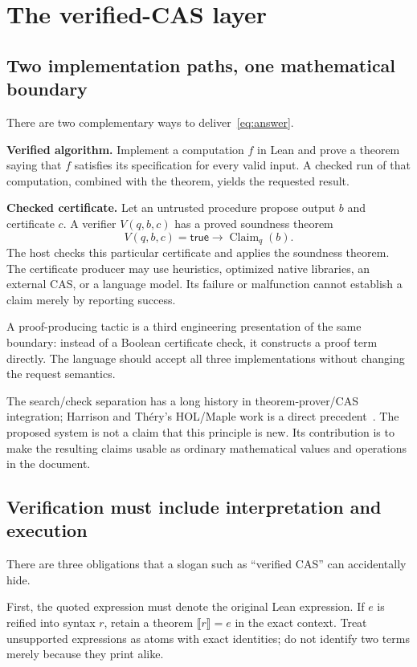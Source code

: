 \documentclass[11pt,a4paper]{article}
\newcommand{\Claim}{\operatorname{Claim}}
\theoremstyle{definition}
\theoremstyle{remark}
\begin{document}
\section{The verified-CAS layer}\label{sec:cas}
\subsection{Two implementation paths, one mathematical boundary}
There are two complementary ways to deliver~\eqref{eq:answer}.

\textbf{Verified algorithm.} Implement a computation $f$ in Lean and prove a theorem saying that $f$ satisfies its specification for every valid input. A checked run of that computation, combined with the theorem, yields the requested result.

\textbf{Checked certificate.} Let an untrusted procedure propose output $b$ and certificate $c$. A verifier $V(q,b,c)$ has a proved soundness theorem
\begin{equation}\label{eq:checker}
V(q,b,c)=\mathsf{true}\longrightarrow\Claim_q(b).
\end{equation}
The host checks this particular certificate and applies the soundness theorem. The certificate producer may use heuristics, optimized native libraries, an external CAS, or a language model. Its failure or malfunction cannot establish a claim merely by reporting success.

A proof-producing tactic is a third engineering presentation of the same boundary: instead of a Boolean certificate check, it constructs a proof term directly. The language should accept all three implementations without changing the request semantics.

The search/check separation has a long history in theorem-prover/CAS integration; Harrison and Th\'ery's HOL/Maple work is a direct precedent~\cite{harrison}. The proposed system is not a claim that this principle is new. Its contribution is to make the resulting claims usable as ordinary mathematical values and operations in the document.

\subsection{Verification must include interpretation and execution}
There are three obligations that a slogan such as ``verified CAS'' can accidentally hide.

First, the quoted expression must denote the original Lean expression. If $e$ is reified into syntax $r$, retain a theorem $\llbracket r\rrbracket=e$ in the exact context. Treat unsupported expressions as atoms with exact identities; do not identify two terms merely because they print alike.
\end{document}
